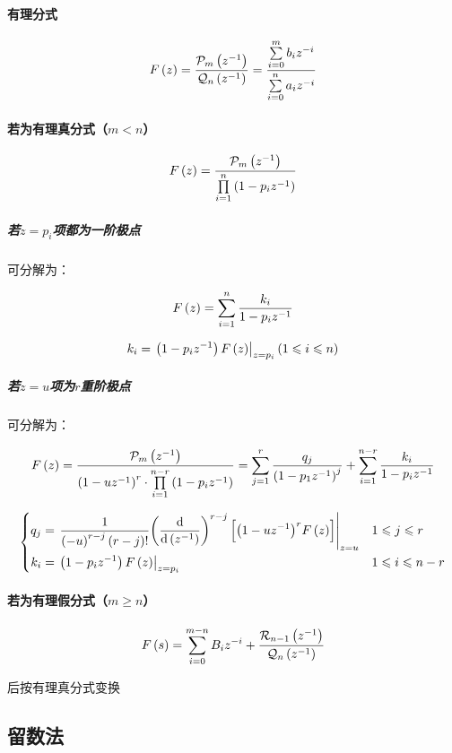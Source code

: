 \documentclass{article}
\begin{document}
\paragraph{有理分式}

\[F\left(z\right)=\frac{\mathcal P_m\left(z^{-1}\right)}{\mathcal Q_n\left(z^{-1}\right)}
    =\frac{\sum\limits_{i=0}^mb_iz^{-i}}{\sum\limits_{i=0}^na_iz^{-i}}\]

\paragraph{若为有理真分式（$m<n$）}

\[F\left(z\right)=\frac{\mathcal P_m\left(z^{-1}\right)}{\prod\limits_{i=1}^n\left(1-p_iz^{-1}\right)}\]

\subparagraph{若$z=p_i$项都为一阶极点}

可分解为：

\[F\left(z\right)=\sum_{i=1}^n\frac{k_i}{1-p_iz^{-1}}\]

\[k_i=\left.\left(1-p_iz^{-1}\right)F\left(z\right)\right|_{z=p_i}\left(1\leqslant i\leqslant n\right)\]

\subparagraph{若$z=u$项为$r$重阶极点}

可分解为：

\[F\left(z\right)=\frac{\mathcal P_m\left(z^{-1}\right)}{{\left(1-uz^{-1}\right)}^r\cdot\prod\limits_{i=1}^{n-r}\left(1-p_iz^{-1}\right)}
    =\sum_{j=1}^r\frac{q_j}{{\left(1-p_1z^{-1}\right)}^j}+\sum_{i=1}^{n-r}\frac{k_i}{1-p_iz^{-1}}\]

\[\left\{\begin{aligned}
        q_j & =\left.\frac1{{\left(-u\right)^{r-j}}\left(r-j\right)!}{\left(\frac{\mathrm d}{\mathrm d\left(z^{-1}\right)}\right)}^{r-j}\left[{\left(1-uz^{-1}\right)}^rF\left(z\right)\right]\right|_{z=u} &  & 1\leqslant j\leqslant r   \\
        k_i & =\left.\left(1-p_iz^{-1}\right)F\left(z\right)\right|_{z=p_i}                                                                             &  & 1\leqslant i\leqslant n-r
    \end{aligned}\right.\]

\paragraph{若为有理假分式（$m\geqslant n$）}

\[F\left(s\right)=\sum_{i=0}^{m-n}B_iz^{-i}+\frac{\mathcal R_{n-1}\left(z^{-1}\right)}{\mathcal Q_n\left(z^{-1}\right)}\]

后按有理真分式变换

\subsection{留数法}
\end{document}

